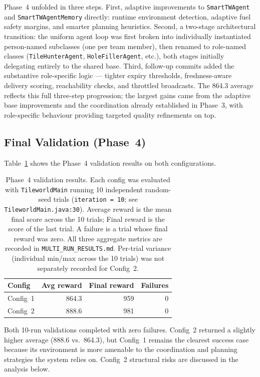 \documentclass[letterpaper]{article}
\begin{document}
Phase~4 unfolded in three steps. First, adaptive improvements to
\texttt{SmartTWAgent} and \texttt{SmartTWAgentMemory} directly: runtime
environment detection, adaptive fuel safety margins, and smarter planning
heuristics. Second, a two-stage architectural transition: the uniform agent loop was first
broken into individually instantiated person-named subclasses (one per team
member), then renamed to role-named classes (\texttt{TileHunterAgent},
\texttt{HoleFillerAgent}, etc.), both stages initially delegating entirely to
the shared base. Third, follow-up commits
added the substantive role-specific logic --- tighter expiry thresholds,
freshness-aware delivery scoring, reachability checks, and throttled broadcasts.
The 864.3 average reflects this full three-step progression; the largest gains
came from the adaptive base improvements and the coordination already established
in Phase~3, with role-specific behaviour providing targeted quality refinements
on top.

\subsection{Final Validation (Phase~4)}

Table~\ref{tab:results} shows the Phase~4 validation results on both
configurations.

\begin{table}[h]
\centering
\small
\begin{tabular}{@{}lrrr@{}}
\toprule
\textbf{Config} & \textbf{Avg reward} & \textbf{Final reward} & \textbf{Failures} \\
\midrule
Config~1 & 864.3 & 959 & 0 \\
Config~2 & 888.6 & 981 & 0 \\
\bottomrule
\end{tabular}
\caption{Phase~4 validation results. Each config was evaluated with
\texttt{TileworldMain} running 10 independent random-seed trials
(\texttt{iteration = 10}; see \texttt{TileworldMain.java:30}). Average reward
is the mean final score across the 10 trials; Final reward is the score of the
last trial. A failure is a trial whose final reward was zero. All three
aggregate metrics are recorded in \texttt{MULTI\_RUN\_RESULTS.md}. Per-trial
variance (individual min/max across the 10 trials) was not separately recorded
for Config~2.}
\label{tab:results}
\end{table}

Both 10-run validations completed with zero failures. Config~2 returned a
slightly higher average (888.6 vs.\ 864.3), but Config~1 remains the clearest
success case because its environment is more amenable to the coordination and
planning strategies the system relies on. Config~2 structural risks are
discussed in the analysis below.
\end{document}
